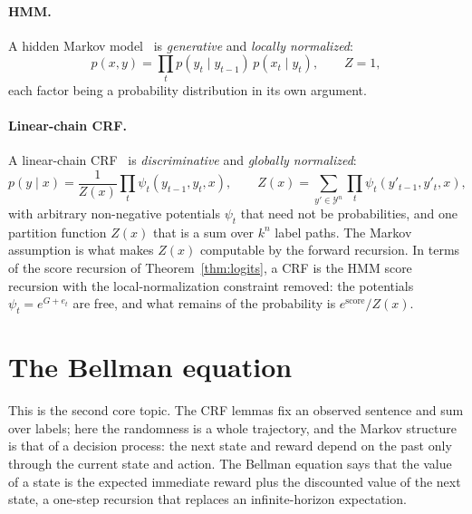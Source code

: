 \documentclass[11pt,a4paper]{article}
\newcommand{\Y}{\mathcal{Y}}
\begin{document}
\paragraph{HMM.}
A hidden Markov model~\cite{rabiner1989hmm} is \emph{generative} and \emph{locally normalized}:
\[
p(x,y)=\prod_{t}p(y_t\mid y_{t-1})\,p(x_t\mid y_t),\qquad Z=1,
\]
each factor being a probability distribution in its own argument.
\paragraph{Linear-chain CRF.}
A linear-chain CRF~\cite{lafferty2001crf,sutton2012crf} is \emph{discriminative} and \emph{globally normalized}:
\[
p(y\mid x)=\frac1{Z(x)}\prod_{t}\psi_t(y_{t-1},y_t,x),\qquad Z(x)=\sum_{y'\in\Y^{n}}\prod_t\psi_t(y'_{t-1},y'_t,x),
\]
with arbitrary non-negative potentials $\psi_t$ that need not be probabilities, and one partition function $Z(x)$ that is a sum over $k^n$ label paths.
The Markov assumption is what makes $Z(x)$ computable by the forward recursion.
In terms of the score recursion of Theorem~\ref{thm:logits}, a CRF is the HMM score recursion with the local-normalization constraint removed: the potentials $\psi_t=e^{G+e_t}$ are free, and what remains of the probability is $e^{\text{score}}/Z(x)$.

\section{The Bellman equation}
\label{sec:bellman}

This is the second core topic.
The CRF lemmas fix an observed sentence and sum over labels; here the randomness is a whole trajectory, and the Markov structure is that of a decision process: the next state and reward depend on the past only through the current state and action.
The Bellman equation says that the value of a state is the expected immediate reward plus the discounted value of the next state, a one-step recursion that replaces an infinite-horizon expectation.
\end{document}
